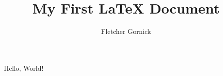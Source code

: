 \documentclass{article}
\author{Fletcher Gornick}
\title{My First {\LaTeX} Document}
\begin{document}
\maketitle

Hello, World!
\end{document}
